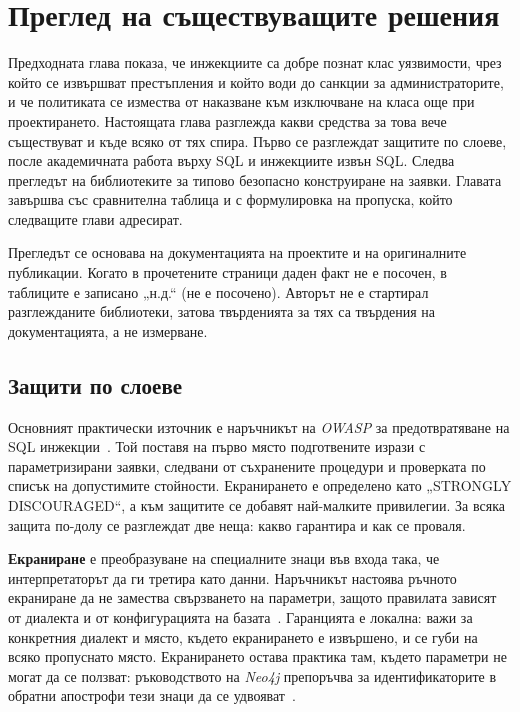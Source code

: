 \section{Преглед на съществуващите решения}
\label{sec:existing}

Предходната глава показа, че инжекциите са добре познат клас уязвимости, чрез който
се извършват престъпления и който води до санкции за администраторите, и че политиката се измества от наказване към изключване на
класа още при проектирането. Настоящата глава разглежда какви средства за това вече
съществуват и къде всяко от тях спира. Първо се разглеждат защитите по слоеве, после
академичната работа върху SQL и инжекциите извън SQL. Следва прегледът на
библиотеките за типово безопасно конструиране на заявки. Главата завършва със
сравнителна таблица и с формулировка на пропуска, който следващите глави адресират.

Прегледът се основава на документацията на проектите и на оригиналните публикации.
Когато в прочетените страници даден факт не е посочен, в таблиците е записано „н.д.“
(не е посочено). Авторът не е стартирал разглежданите библиотеки, затова твърденията
за тях са твърдения на документацията, а не измерване.

\subsection{Защити по слоеве}
\label{sec:existing-layers}

Основният практически източник е наръчникът на \textit{OWASP} за предотвратяване на
SQL инжекции~\cite{owasp_sqli_prevention}. Той поставя на първо място подготвените
изрази с параметризирани заявки, следвани от съхранените процедури и проверката по
списък на допустимите стойности. Екранирането е определено като „STRONGLY
DISCOURAGED“, а към защитите се добавят най-малките привилегии. За всяка защита по-долу
се разглеждат две неща: какво гарантира и как се проваля.

\textbf{Екраниране} е преобразуване на специалните знаци във входа така, че
интерпретаторът да ги третира като данни. Наръчникът настоява ръчното екраниране да не
замества свързването на параметри, защото правилата зависят от диалекта и от
конфигурацията на базата~\cite{owasp_sqli_prevention}. Гаранцията е локална: важи за
конкретния диалект и място, където екранирането е извършено, и се губи на всяко
пропуснато място. Екранирането остава практика там, където параметри не могат да се
ползват: ръководството на \textit{Neo4j} препоръчва за идентификаторите в обратни
апострофи тези знаци да се удвояват~\cite{neo4j_cypher_injection_kb}.

